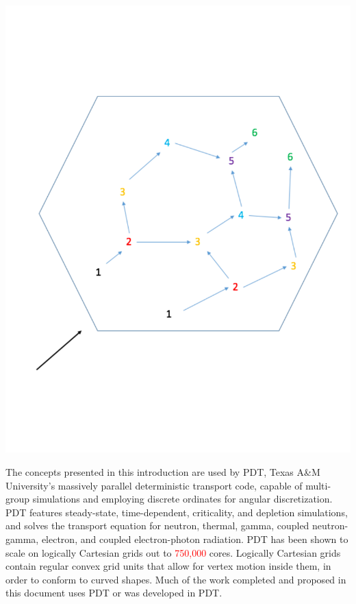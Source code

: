 \documentclass[11pt, letterpaper,titlepage,oneside]{article}
\newcommand{\tcr}[1]{\textcolor{red}{#1}}
\begin{document}
\noindent\begin{minipage}{\textwidth}
\centering
\includegraphics[scale = 0.35]{../figures/tdg.pdf}
\label{tdg}
\end{minipage}
\smallskip

The concepts presented in this introduction are used by PDT, Texas A\&M University's massively parallel deterministic transport code, capable of multi-group simulations and employing discrete ordinates for angular discretization. PDT features steady-state, time-dependent, criticality, and depletion simulations, and solves the transport equation for neutron, thermal, gamma, coupled neutron-gamma, electron, and coupled electron-photon radiation. PDT has been shown to scale on logically Cartesian grids out to \tcr{750,000} cores. Logically Cartesian grids contain regular convex grid units that allow for vertex motion inside them, in order to conform to curved shapes. Much of the work completed and proposed in this document uses PDT or was developed in PDT. 
\end{document}
